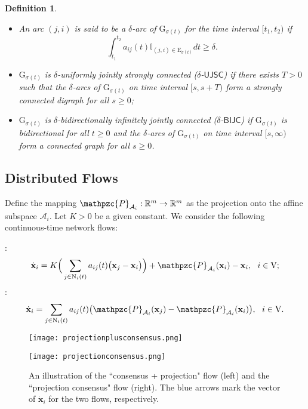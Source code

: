 \documentclass[a4paper, 11pt]{article}
\newtheorem{definition}{Definition}
\begin{document}
\begin{definition}
\begin{itemize}
\item[(i)] An arc $(j,i)$ is said to be a $\delta$-arc of $\mathrm{G}_{\sigma(t)}$ for the
time interval $[t_1,t_2)$  if $$
\int_{t_1}^{t_2}a_{ij}(t) \mathbb{I}_{(j,i)\in \mathrm{E}_{\sigma(t)}}dt\geq \delta.
$$

\item[(ii)] $\mathrm{G}_{\sigma(t)}$ is $\delta$-uniformly jointly strongly connected ($\delta$-$\mathsf{UJSC}$) if there exists $T>0$ such that  the  $\delta$-arcs of  $\mathrm{G}_{\sigma(t)}$ on time interval $[s,s+T)$ form a  strongly connected digraph for all $s\geq 0$;

\item[(iii)] $\mathrm{G}_{\sigma(t)}$ is $\delta$-bidirectionally infinitely  jointly  connected ($\delta$-$\mathsf{BIJC}$) if   $\mathrm{G}_{\sigma(t)}$ is bidirectional for all $t\geq 0$ and the  $\delta$-arcs of  $\mathrm{G}_{\sigma(t)}$ on time interval $[s,\infty)$ form a connected graph for all $s\geq 0$.
    \end{itemize}
\end{definition}
\subsection{Distributed Flows}
Define the mapping $\mathpzc{P}_{\mathcal{A}_i}: \mathbb{R}^m \rightarrow \mathbb{R}^m$ as the projection onto the affine subspace $\mathcal{A}_i$. Let $K>0$ be a given constant. We consider the following continuous-time network flows:

\medskip

:
\begin{align}\label{1}
 \dot{\mathbf{x}}_i =K\Big( \sum_{j\in \mathrm{N}_i(t)}a_{ij}(t)\big(\mathbf{x}_j-\mathbf{x}_i\big) \Big)+ \mathpzc{P}_{\mathcal{A}_i}(\mathbf{x}_i)-\mathbf{x}_i,\ \  i\in\mathrm{V};
\end{align}
:
\begin{align}\label{2}
 \dot{\mathbf{x}}_i =  \sum_{j\in \mathrm{N}_i(t)}a_{ij}(t)\big(\mathpzc{P}_{\mathcal{A}_i}(\mathbf{x}_j)-\mathpzc{P}_{\mathcal{A}_i}(\mathbf{x}_i)\big),\ \  i\in\mathrm{V}.
\end{align}



\begin{figure*}
\begin{minipage}[t]{0.5\linewidth}
\centering
\texttt{[image: projectionplusconsensus.png]}
\end{minipage}\begin{minipage}[t]{0.5\linewidth}
\centering
\texttt{[image: projectionconsensus.png]}
\end{minipage}
\caption{An illustration of the ``consensus + projection" flow (left) and the ``projection consensus" flow (right). The blue arrows mark the vector of $\dot{\mathbf{x}}_i$ for the two flows, respectively.}
\label{fig:twoflows}
\end{figure*}
\end{document}
